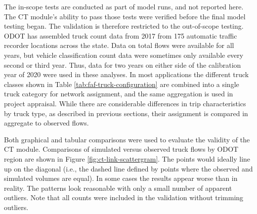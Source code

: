 The in-scope tests are conducted as part of model runs, and not reported here. The CT module's ability to pass those tests were verified before the final model testing began. The validation is therefore restricted to the out-of-scope testing. ODOT has assembled truck count data from 2017 from 175 automatic traffic recorder locations across the state. Data on total flows were available for all years, but vehicle classification count data were sometimes only available every second or third year. Thus, data for two years on either side of the calibration year of 2020 were used in these analyses. In most applications the different truck classes shown in Table \ref{tab:faf-truck-configuration} are combined into a single truck category for network assignment, and the same aggregation is used in project appraisal. While there are considerable differences in trip characteristics by truck type, as described in previous sections, their assignment is compared in aggregate to observed flows. 

Both graphical and tabular comparisons were used to evaluate the validity of the CT module. Comparisons of simulated versus observed truck flows by ODOT region are shown in Figure \ref{fig:ct-link-scattergram}. The points would ideally line up on the diagonal (i.e., the dashed line defined by points where the observed and simulated volumes are equal). In some cases the results appear worse than in reality. The patterns look reasonable with only a small number of apparent outliers. Note that all counts were included in the validation without trimming outliers.

